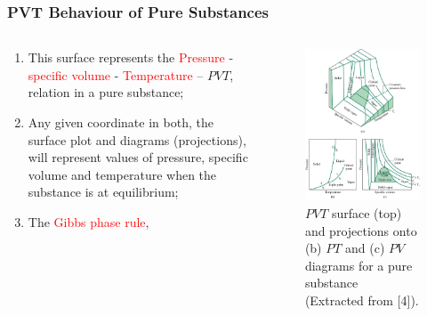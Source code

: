 \documentclass[10pt,compress,handout,ignorenonframetext]{beamer}
\begin{document}
\begin{frame}
 \frametitle{PVT Behaviour of Pure Substances}
 \begin{columns}
  \begin{column}[l]{0.5\linewidth}
    \begin{enumerate}\scriptsize
    \item <1-> This surface represents the \textcolor{red}{Pressure} - \textcolor{red}{specific volume} - \textcolor{red}{Temperature} -- $PVT$, relation in a pure substance;
    \item <2-> Any given coordinate in both, the surface plot and diagrams (projections), will represent values of pressure, specific volume and temperature when the substance is at equilibrium;
    \item <3-> The \textcolor{red}{Gibbs phase rule},
\end{enumerate}
  \end{column}
  \begin{column}[l]{0.5\linewidth}
   \begin{figure}%
    \begin{center}
     \includegraphics[width=4.cm,clip]{./Pics/PVT_Surface.jpg}
    \end{center}
    \scriptsize\caption{\scriptsize$PVT$ surface (top) and projections onto (b) $PT$ and (c) $PV$ diagrams for a pure substance (Extracted from [4]).}
   \end{figure}    
  \end{column}
 \end{columns}
\end{frame}
\end{document}
